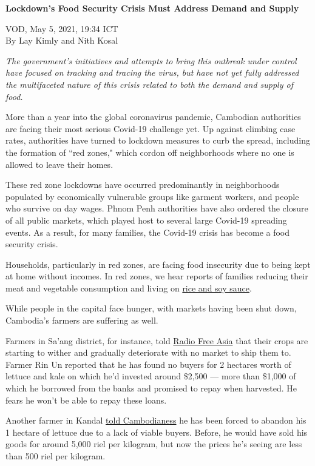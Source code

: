 \documentclass[10pt,a4paper]{letter}
\begin{document}
	
{\Large 
	\textbf{Lockdown's Food Security Crisis Must Address Demand and Supply}
} 

VOD, May 5, 2021, 19:34 ICT \\
By Lay Kimly and Nith Kosal

\textit{The government's initiatives and attempts to bring this outbreak under control have focused on tracking and tracing the virus, but have not yet fully addressed the multifaceted nature of this crisis related to both the demand and supply of food.
}

More than a year into the global coronavirus pandemic, Cambodian authorities are facing their most serious Covid-19 challenge yet. Up against climbing case rates, authorities have turned to lockdown measures to curb the spread, including the formation of ``red zones," which cordon off neighborhoods where no one is allowed to leave their homes.

These red zone lockdowns have occurred predominantly in neighborhoods populated by economically vulnerable groups like garment workers, and people who survive on day wages. Phnom Penh authorities have also ordered the closure of all public markets, which played host to several large Covid-19 spreading events.
As a result, for many families, the Covid-19 crisis has become a food security crisis.

Households, particularly in red zones, are facing food insecurity due to being kept at home without incomes. In red zones, we hear reports of families reducing their meat and vegetable consumption and living on \href{https://www.scmp.com/week-asia/economics/article/3131048/cambodia-extended-phnom-penh-coronavirus-lockdown-leaves}{rice and soy sauce}.

While people in the capital face hunger, with markets having been shut down, Cambodia's farmers are suffering as well.

Farmers in Sa'ang district, for instance, told \href{https://www.rfa.org/khmer/news/economy/farmers-leave-their-vegetables-at-fields-due-to-lack-of-market-while-capital-residents-lack-of-vegetables-04222021075303.html}{Radio Free Asia} that their crops are starting to wither and gradually deteriorate with no market to ship them to. Farmer Rin Un reported that he has found no buyers for 2 hectares worth of lettuce and kale on which he'd invested around \$2,500 --- more than \$1,000 of which he borrowed from the banks and promised to repay when harvested. He fears he won't be able to repay these loans.

Another farmer in Kandal \href{https://cambodianess.com/article/farmer-unable-to-donate-produce-to-locked-down-families}{told Cambodianess} he has been forced to abandon his 1 hectare of lettuce due to a lack of viable buyers. Before, he would have sold his goods for around 5,000 riel per kilogram, but now the prices he's seeing are less than 500 riel per kilogram.
\end{document}
